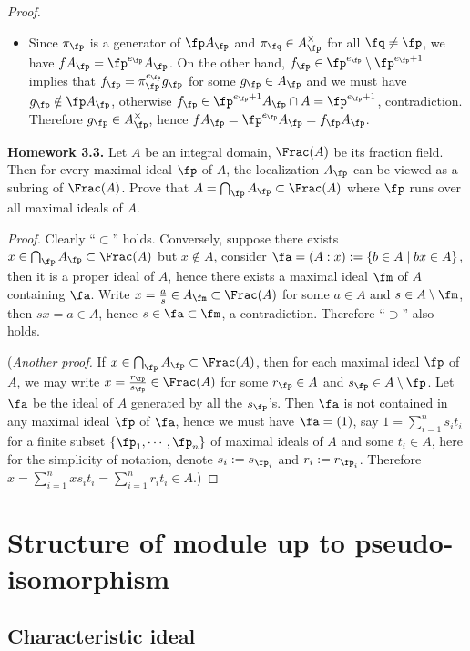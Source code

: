 \begin{proof}
\begin{itemize}
\item
Since $\pi_\fp$ is a generator of $\fp A_\fp$
and $\pi_\fq\in A_\fp^\times$ for all $\fq\neq\fp$,
we have $fA_\fp=\fp^{e_\fp}A_\fp$.
On the other hand, $f_\fp\in\fp^{e_\fp}\setminus\fp^{e_\fp+1}$ implies that
$f_\fp=\pi_\fp^{e_\fp}g_\fp$ for some $g_\fp\in A_\fp$
and we must have $g_\fp\notin\fp A_\fp$, otherwise $f_\fp\in\fp^{e_\fp+1}A_\fp\cap A=\fp^{e_\fp+1}$, contradiction. Therefore $g_\fp\in A_\fp^\times$,
hence $fA_\fp=\fp^{e_\fp}A_\fp=f_\fp A_\fp$.
\end{itemize}

\textbf{Homework 3.3.}
Let $A$ be an integral domain, $\Frac(A)$ be its fraction field.
Then for every maximal ideal $\fp$ of $A$,
the localization $A_\fp$ can be viewed as a subring of $\Frac(A)$.
Prove that $A=\bigcap_\fp A_\fp\subset\Frac(A)$
where $\fp$ runs over all maximal ideals of $A$.

\emph{Proof.}
Clearly ``$\subset$'' holds.
Conversely, suppose there exists $x\in\bigcap_\fp A_\fp\subset\Frac(A)$
but $x\notin A$,
consider $\fa=(A:x):=\{b\in A\mid bx\in A\}$,
then it is a proper ideal of $A$,
hence there exists a maximal ideal $\fm$ of $A$ containing $\fa$.
Write $x=\frac as\in A_\fm\subset\Frac(A)$
for some $a\in A$ and $s\in A\setminus\fm$,
then $sx=a\in A$, hence $s\in\fa\subset\fm$, a contradiction.
Therefore ``$\supset$'' also holds.

(\emph{Another proof.}
If $x\in\bigcap_\fp A_\fp\subset\Frac(A)$,
then for each maximal ideal $\fp$ of $A$,
we may write $x=\frac{r_\fp}{s_\fp}\in\Frac(A)$ for some $r_\fp\in A$
and $s_\fp\in A\setminus\fp$. Let $\fa$ be the ideal of $A$ generated by all the $s_\fp$'s.
Then $\fa$ is not contained in any maximal ideal $\fp$ of $\fa$,
hence we must have $\fa=(1)$, say $1=\sum_{i=1}^ns_it_i$
for a finite subset $\{\fp_1,\cdots,\fp_n\}$ of maximal ideals of $A$
and some $t_i\in A$, here for the simplicity of notation, denote
$s_i:=s_{\fp_i}$ and $r_i:=r_{\fp_i}$.
Therefore $x=\sum_{i=1}^nxs_it_i=\sum_{i=1}^nr_it_i\in A$.)
\end{proof}
\fi

\section{Structure of module up to pseudo-isomorphism}

\subsection{Characteristic ideal}

